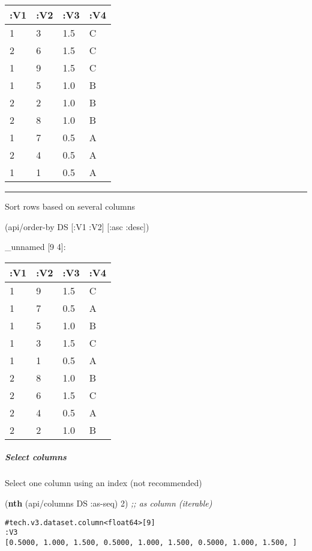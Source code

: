 \documentclass[]{article}
\newenvironment{Shaded}{\begin{snugshade}}{\end{snugshade}}
\newcommand{\AttributeTok}[1]{\textcolor[rgb]{0.77,0.63,0.00}{#1}}
\newcommand{\CommentTok}[1]{\textcolor[rgb]{0.56,0.35,0.01}{\textit{#1}}}
\newcommand{\DecValTok}[1]{\textcolor[rgb]{0.00,0.00,0.81}{#1}}
\newcommand{\KeywordTok}[1]{\textcolor[rgb]{0.13,0.29,0.53}{\textbf{#1}}}
\newcommand{\NormalTok}[1]{#1}
\let\oldsubparagraph\subparagraph
\renewcommand{\subparagraph}[1]{\oldsubparagraph{#1}\mbox{}}
\begin{document}
\begin{longtable}[]{@{}llll@{}}
\toprule
:V1 & :V2 & :V3 & :V4\tabularnewline
\midrule
\endhead
1 & 3 & 1.5 & C\tabularnewline
2 & 6 & 1.5 & C\tabularnewline
1 & 9 & 1.5 & C\tabularnewline
1 & 5 & 1.0 & B\tabularnewline
2 & 2 & 1.0 & B\tabularnewline
2 & 8 & 1.0 & B\tabularnewline
1 & 7 & 0.5 & A\tabularnewline
2 & 4 & 0.5 & A\tabularnewline
1 & 1 & 0.5 & A\tabularnewline
\bottomrule
\end{longtable}

\begin{center}\rule{0.5\linewidth}{0.5pt}\end{center}

Sort rows based on several columns

\begin{Shaded}
\begin{Highlighting}[]
\NormalTok{(api/order-by DS [}\AttributeTok{:V1} \AttributeTok{:V2}\NormalTok{] [}\AttributeTok{:asc} \AttributeTok{:desc}\NormalTok{])}
\end{Highlighting}
\end{Shaded}

\_unnamed {[}9 4{]}:

\begin{longtable}[]{@{}llll@{}}
\toprule
:V1 & :V2 & :V3 & :V4\tabularnewline
\midrule
\endhead
1 & 9 & 1.5 & C\tabularnewline
1 & 7 & 0.5 & A\tabularnewline
1 & 5 & 1.0 & B\tabularnewline
1 & 3 & 1.5 & C\tabularnewline
1 & 1 & 0.5 & A\tabularnewline
2 & 8 & 1.0 & B\tabularnewline
2 & 6 & 1.5 & C\tabularnewline
2 & 4 & 0.5 & A\tabularnewline
2 & 2 & 1.0 & B\tabularnewline
\bottomrule
\end{longtable}

\hypertarget{select-columns}{%
\subparagraph{Select columns}\label{select-columns}}

Select one column using an index (not recommended)

\begin{Shaded}
\begin{Highlighting}[]
\NormalTok{(}\KeywordTok{nth}\NormalTok{ (api/columns DS }\AttributeTok{:as-seq}\NormalTok{) }\DecValTok{2}\NormalTok{) }\CommentTok{;; as column (iterable)}
\end{Highlighting}
\end{Shaded}

\begin{verbatim}
#tech.v3.dataset.column<float64>[9]
:V3
[0.5000, 1.000, 1.500, 0.5000, 1.000, 1.500, 0.5000, 1.000, 1.500, ]
\end{verbatim}
\end{document}
